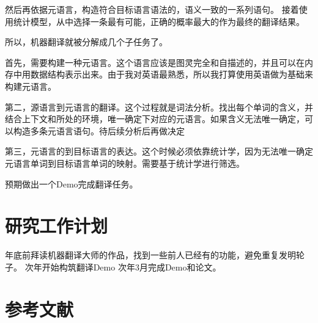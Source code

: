 \documentclass[12pt,a4paper]{article}
\begin{document}
\begin{onehalfspace}
然后再依据元语言，构造符合目标语言语法的，语义一致的一系列语句。 
接着使用统计模型，从中选择一条最有可能，正确的概率最大的作为最终的翻译结果。 \cite{统计机器翻译}

所以，机器翻译就被分解成几个子任务了。 

首先，需要构建一种元语言。这个语言应该是图灵完全和自描述的，并且可以在内存中用数据结构表示出来。由于我对英语最熟悉，所以我打算使用英语做为基础来构建元语言。 

第二，源语言到元语言的翻译。这个过程就是词法分析。找出每个单词的含义，并结合上下文和所处的环境，唯一确定下对应的元语言。如果含义无法唯一确定，可以构造多条元语言语句。待后续分析后再做决定 

第三，元语言的到目标语言的表达。这个时候必须依靠统计学，因为无法唯一确定元语言单词到目标语言单词的映射。需要基于统计学进行筛选。 

预期做出一个Demo完成翻译任务。

\section{研究工作计划}

年底前拜读机器翻译大师的作品，找到一些前人已经有的功能，避免重复发明轮子。
次年开始构筑翻译Demo
次年3月完成Demo和论文。

\end{onehalfspace}

\section{参考文献}



\end{document}
